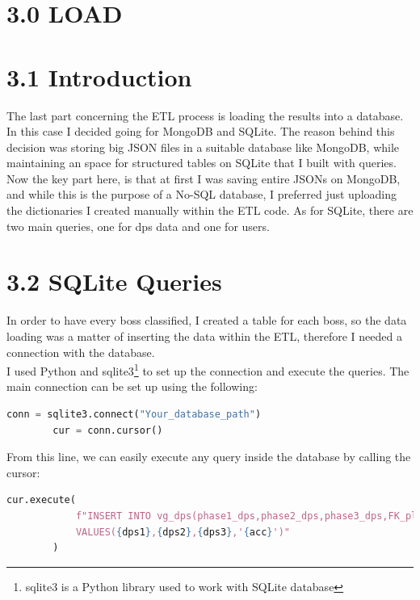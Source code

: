\documentclass[12pt,a4paper]{article}
\begin{document}
    \newpage

    \section*{3.0 LOAD}

    \section*{\large 3.1 Introduction}
    The last part concerning the ETL process is loading the results into a database. 
    In this case I decided going for MongoDB and SQLite.
    The reason behind this decision was storing big JSON files in a suitable database like MongoDB, while
    maintaining an space for structured tables on SQLite that I built with queries.\\

    Now the key part here, is that at first I was saving entire JSONs on MongoDB, and while this is the
    purpose of a No-SQL database, I preferred just uploading the dictionaries I created manually within the
    ETL code. As for SQLite, there are two main queries, one for dps data and one for users.

    \section*{\large 3.2 SQLite Queries}
    In order to have every boss classified, I created a table for each boss, so the data loading was a matter
    of inserting the data within the ETL, therefore I needed a connection with the database.\\

    I used Python and sqlite3\footnote{sqlite3 is a Python library used to work with SQLite database} to set 
    up the connection and execute the queries. The main connection can be set up using the following:

    \begin{lstlisting}[language=Python, caption=SQLite Connection]
        conn = sqlite3.connect("Your_database_path")
        cur = conn.cursor()
    \end{lstlisting}

    \bigskip

    From this line, we can easily execute any query inside the database by calling the cursor:

    \begin{lstlisting}[language=Python, caption=Query example]
        cur.execute(
            f"INSERT INTO vg_dps(phase1_dps,phase2_dps,phase3_dps,FK_player_id) \
            VALUES({dps1},{dps2},{dps3},'{acc}')"
        )
    \end{lstlisting}
\end{document}
